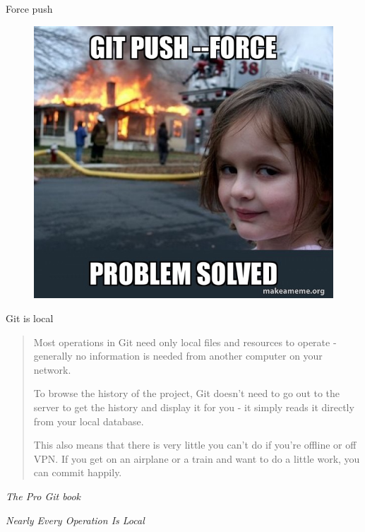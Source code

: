 \documentclass[10pt,aspectratio=169]{beamer}
\begin{document}
\begin{frame}[fragile]{Force push}
    \begin{figure}
        \includegraphics[scale=0.35]{memes/meme-git-force.jpg}
    \end{figure}
\end{frame}

\begin{frame}[fragile]{Git is local}
    \begin{quote}
        Most operations in Git need only local files and resources to operate - generally no information is needed from another computer on your network.

        \vspace*{\baselineskip}

        To browse the history of the project, Git doesn't need to go out to the server to get the history and display it for you - it simply reads it directly from your local database.

        \vspace*{\baselineskip}

        This also means that there is very little you can't do if you're offline or off VPN. If you get on an airplane or a train and want to do a little work, you can commit happily.
    \end{quote}
    \begin{flushright}
        \textit{The Pro Git book}
    \end{flushright}

    \textit{Nearly Every Operation Is Local}
\end{frame}
\end{document}
